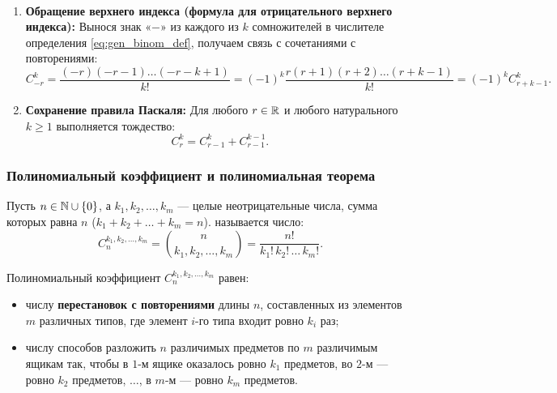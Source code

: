 \begin{properties} ~
    \begin{enumerate}
        \item \textbf{Обращение верхнего индекса (формула для 
        отрицательного верхнего индекса):} 
        Вынося знак «$-$» из каждого из $k$ сомножителей в числителе 
        определения \eqref{eq:gen_binom_def}, получаем связь с сочетаниями 
        с повторениями:
        \begin{equation} \label{eq:neg_binom_id}
            C_{-r}^k = \frac{(-r)(-r - 1) \dots (-r - k + 1)}{k!} = 
            (-1)^k \frac{r(r + 1)(r + 2) \dots (r + k - 1)}{k!} = 
            (-1)^k C_{r+k-1}^k. \tag{15}
        \end{equation}
        \item \textbf{Сохранение правила Паскаля:} 
        Для любого $r \in \mathbb{R}$ и любого натурального $k \ge 1$ выполняется 
        тождество:
        \[
            C_r^k = C_{r-1}^k + C_{r-1}^{k-1}.
        \]
    \end{enumerate}
\end{properties}

\subsubsection{Полиномиальный коэффициент и полиномиальная теорема}

\begin{definition}
    Пусть $n \in \mathbb{N} \cup \{0\}$, а $k_1, k_2, \dots, k_m$ --- целые 
    неотрицательные числа, сумма которых равна $n$ 
    ($k_1 + k_2 + \dots + k_m = n$).  называется число:
    \begin{equation} \label{eq:multinom_coeff}
        C_n^{k_1, k_2, \dots, k_m} = \binom{n}{k_1, k_2, \dots, k_m} = 
        \frac{n!}{k_1! \, k_2! \, \dots \, k_m!}. \tag{16}
    \end{equation}
\end{definition}

\begin{remark}
    Полиномиальный коэффициент $C_n^{k_1, k_2, \dots, k_m}$ равен:
    \begin{itemize}
        \item числу \textbf{перестановок с повторениями} длины $n$, 
        составленных из элементов $m$ различных типов, где элемент $i$-го 
        типа входит ровно $k_i$ раз;
        \item числу способов разложить $n$ различимых предметов по $m$ 
        различимым ящикам так, чтобы в $1$-м ящике оказалось ровно $k_1$ 
        предметов, во $2$-м --- ровно $k_2$ предметов, $\dots$, в $m$-м --- 
        ровно $k_m$ предметов.
    \end{itemize}
\end{remark}

